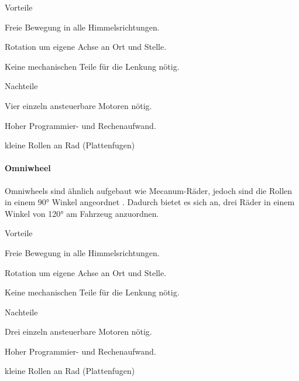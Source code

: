 \documentclass[../main.tex]{subfiles}
\begin{document}
\begin{minipage}[t]{0.48\textwidth}
    \begin{items}
      \item [Vorteile]
      \item Freie Bewegung in alle Himmelsrichtungen.
      \item Rotation um eigene Achse an Ort und Stelle.
      \item Keine mechanischen Teile für die Lenkung nötig.
 \end{items}
\end{minipage}
\hfill
\begin{minipage}[t]{0.48\textwidth}
    \begin{items}
      \item [Nachteile]
      \item Vier einzeln ansteuerbare Motoren nötig.
      \item Hoher Programmier- und Rechenaufwand.
      \item kleine Rollen an Rad (Plattenfugen)
    \end{items}
\end{minipage}

\paragraph{Omniwheel} \label{recherche-omniwheel}

Omniwheels sind ähnlich aufgebaut wie Mecanum-Räder, jedoch sind die Rollen in einem 90° Winkel angeordnet \cite{omniwheel}. Dadurch bietet es sich an, drei Räder in einem Winkel von 120° am Fahrzeug anzuordnen.

\begin{minipage}[t]{0.48\textwidth}
    \begin{items}
        \item[Vorteile]
        \item Freie Bewegung in alle Himmelsrichtungen.
      \item Rotation um eigene Achse an Ort und Stelle.
      \item Keine mechanischen Teile für die Lenkung nötig.
    \end{items}
\end{minipage}
\begin{minipage}[t]{0.48\textwidth}
    \begin{items}
      \item [Nachteile]
      \item Drei einzeln ansteuerbare Motoren nötig.
      \item Hoher Programmier- und Rechenaufwand.
      \item kleine Rollen an Rad (Plattenfugen)
    \end{items}
\end{minipage}
\end{document}
